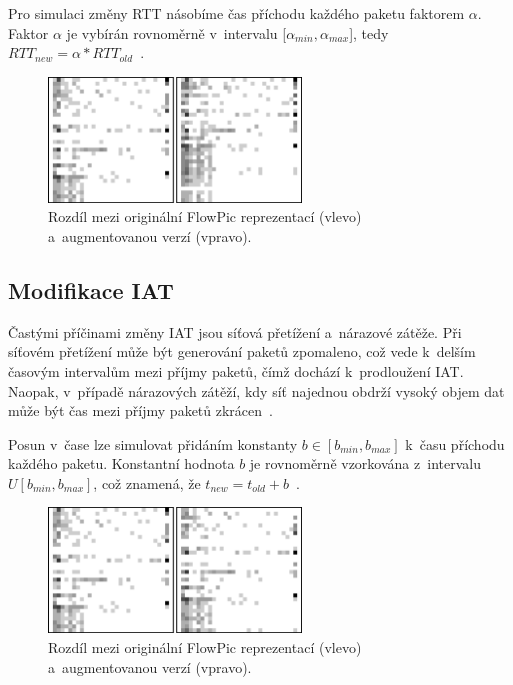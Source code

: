 Pro simulaci změny RTT násobíme čas příchodu každého paketu faktorem $\alpha$. Faktor $\alpha$ je vybírán rovnoměrně v~intervalu [$\alpha_{min}, \alpha_{max}$], tedy $RTT_{new} = \alpha * RTT_{old}$~\cite{flowpic_augmentations}.

\begin{figure}[H]
	\centering
	\includegraphics[width=0.6\textwidth]{obrazky-figures/rtt_and_orig.png}
	\caption{Rozdíl mezi originální FlowPic reprezentací (vlevo) a~augmentovanou verzí (vpravo).}
	\label{flowpic_rtt}
\end{figure}


\subsection{Modifikace IAT}
Častými příčinami změny IAT jsou síťová přetížení a~nárazové zátěže. Při síťovém přetížení může být generování paketů zpomaleno, což vede k~delším časovým intervalům mezi příjmy paketů, čímž dochází k~prodloužení IAT. Naopak, v~případě nárazových zátěží, kdy síť najednou obdrží vysoký objem dat může být čas mezi příjmy paketů zkrácen~\cite{flowpic_augmentations}. 

Posun v~čase lze simulovat přidáním konstanty $b \in [b_{min}, b_{max}]$ k~času příchodu každého paketu. Konstantní hodnota $b$ je rovnoměrně vzorkována z~intervalu $U[b_{min}, b_{max}]$, což znamená, že $t_{new} = t_{old} + b$~\cite{simclr}.

\begin{figure}[H]
	\centering
	\includegraphics[width=0.6\textwidth]{obrazky-figures/iat_and_orig.png}
	\caption{Rozdíl mezi originální FlowPic reprezentací (vlevo) a~augmentovanou verzí (vpravo).}
	\label{flowpic_iat}
\end{figure}

